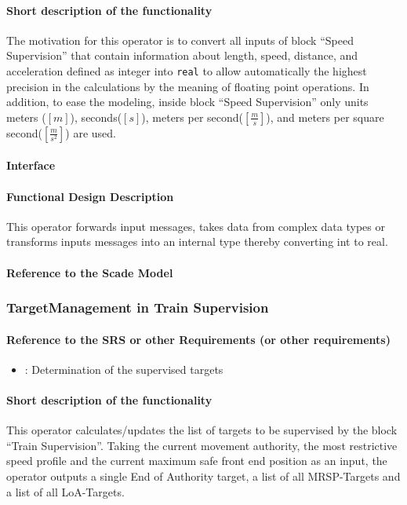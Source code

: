 \paragraph{Short description of the functionality}
The motivation for this operator is to convert all inputs of block ``Speed Supervision'' that contain information about length, speed, distance, and acceleration defined as integer into \texttt{real} to allow automatically the highest precision in the calculations by the meaning of floating point operations. In addition, to ease the modeling, inside block ``Speed Supervision'' only units meters ($[m]$), seconds($[s]$), meters per second($[\frac{m}{s}]$), and meters per square second($[\frac{m}{s^{2}}]$) are used.

\paragraph{Interface}

\paragraph{Functional Design Description}
This operator forwards input messages, takes data from complex data types or transforms inputs messages into an internal type thereby converting int to real.
  
\paragraph{Reference to the Scade Model}

\subsubsection{TargetManagement in Train Supervision}

\paragraph{Reference to the SRS or other Requirements (or other requirements)}
\begin{itemize}
	\item \cite[Chapt.~3.13.8.2]{subset-026}: Determination of the supervised targets 
\end{itemize}

\paragraph{Short description of the functionality}
This operator calculates/updates the list of targets to be supervised by the block ``Train Supervision''. Taking the current movement authority, the most restrictive speed profile and the current maximum safe front end position as an input, the operator outputs a single End of Authority target, a list of all MRSP-Targets and a list of all LoA-Targets.
  
